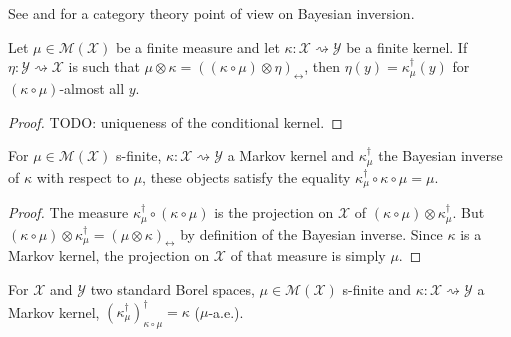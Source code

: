 See \cite{clerc2017pointless} and \cite{dahlqvist2018borel} for a category theory point of view on Bayesian inversion.

\begin{lemma}
  \label{lem:eq_bayesInv_of_compProd_eq}
  \leanok
  Let $\mu \in \mathcal M(\mathcal X)$ be a finite measure and let $\kappa : \mathcal X \rightsquigarrow \mathcal Y$ be a finite kernel.
  If $\eta : \mathcal Y \rightsquigarrow \mathcal X$ is such that $\mu \otimes \kappa = ((\kappa \circ \mu) \otimes \eta)_\leftrightarrow$, then $\eta(y) = \kappa_\mu^\dagger(y)$ for $(\kappa \circ \mu)$-almost all $y$.
\end{lemma}

\begin{proof}\leanok
\uses{}
TODO: uniqueness of the conditional kernel.
\end{proof}


\begin{lemma}
  \label{lem:bayesInv_comp_self}
  \leanok
  For $\mu \in \mathcal M(\mathcal X)$ s-finite, $\kappa : \mathcal X \rightsquigarrow \mathcal Y$ a Markov kernel and $\kappa_\mu^\dagger$ the Bayesian inverse of $\kappa$ with respect to $\mu$, these objects satisfy the equality $\kappa_\mu^\dagger \circ \kappa \circ \mu = \mu$.
\end{lemma}

\begin{proof}\leanok
\uses{}
The measure $\kappa_\mu^\dagger \circ (\kappa \circ \mu)$ is the projection on $\mathcal X$ of $(\kappa \circ \mu) \otimes \kappa_\mu^\dagger$. But $(\kappa \circ \mu) \otimes \kappa_\mu^\dagger = (\mu \otimes \kappa)_\leftrightarrow$ by definition of the Bayesian inverse. Since $\kappa$ is a Markov kernel, the projection on $\mathcal X$ of that measure is simply $\mu$.
\end{proof}


\begin{lemma}
  \label{lem:bayesInv_self}
  \leanok
  For $\mathcal X$ and $\mathcal Y$ two standard Borel spaces, $\mu \in \mathcal M(\mathcal X)$ s-finite and $\kappa : \mathcal X \rightsquigarrow \mathcal Y$ a Markov kernel, $(\kappa_\mu^\dagger)_{\kappa \circ \mu}^\dagger = \kappa$ ($\mu$-a.e.).
\end{lemma}

